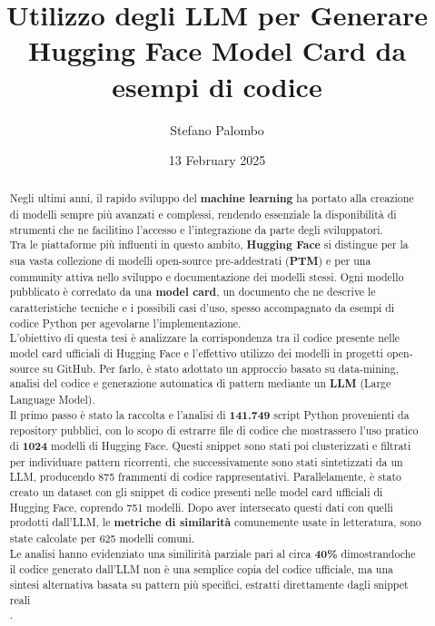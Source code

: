 \documentclass{article}
\title{Utilizzo degli LLM per Generare Hugging Face Model Card da esempi di codice}
\author{Stefano Palombo}
\date{13 February 2025}
\begin{document}
\maketitle

\begin{abstract}
Negli ultimi anni, il rapido sviluppo del \textbf{machine learning} ha portato alla creazione di modelli sempre più avanzati e complessi, rendendo essenziale la disponibilità di strumenti che ne facilitino l’accesso e l’integrazione da parte degli sviluppatori.\\ 
Tra le piattaforme più influenti in questo ambito, \textbf{Hugging Face} si distingue per la sua vasta collezione di modelli open-source pre-addestrati (\textbf{PTM}) e per una community attiva nello sviluppo e documentazione dei modelli stessi. Ogni modello pubblicato è corredato da una \textbf{model card}, un documento che ne descrive le caratteristiche tecniche e i possibili casi d’uso, spesso accompagnato da esempi di codice Python per agevolarne l’implementazione.\\
L’obiettivo di questa tesi è analizzare la corrispondenza tra il codice presente nelle model card ufficiali di Hugging Face e l’effettivo utilizzo dei modelli in progetti open-source su GitHub. Per farlo, è stato adottato un approccio basato su data-mining, analisi del codice e generazione automatica di pattern mediante un \textbf{LLM} (Large Language Model).\\
Il primo passo è stato la raccolta e l’analisi di \textbf{141.749} script Python provenienti da repository pubblici, con lo scopo di estrarre file di codice che mostrassero l’uso pratico di \textbf{1024} modelli di Hugging Face. Questi snippet sono stati poi clusterizzati e filtrati per individuare pattern ricorrenti, che successivamente sono stati sintetizzati da un LLM, producendo 875 frammenti di codice rappresentativi. Parallelamente, è stato creato un dataset con gli snippet di codice presenti nelle model card ufficiali di Hugging Face, coprendo 751 modelli. Dopo aver intersecato questi dati con quelli prodotti dall’LLM, le \textbf{metriche di similarità} comunemente usate in letteratura, sono state calcolate per 625 modelli comuni.\\
Le analisi hanno evidenziato una similirità parziale pari al circa \textbf{40\%} dimostrandoche il codice generato dall’LLM non è una semplice copia del codice ufficiale, ma una sintesi alternativa basata su pattern più specifici, estratti direttamente dagli snippet reali\\.

\end{abstract}
\end{document}
